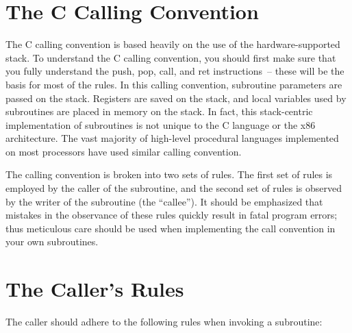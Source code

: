 \section{The C Calling Convention}

The C calling convention is based heavily on the use of the
hardware-supported stack. To understand the C calling convention, you
should first make sure that you fully understand the push, pop, call,
and ret instructions~-- these will be the basis for most of the rules.
In this calling convention, subroutine parameters are passed on the
stack. Registers are saved on the stack, and local variables used by
subroutines are placed in memory on the stack. In fact, this
stack-centric implementation of subroutines is not unique to the C
language or the x86 architecture. The vast majority of high-level
procedural languages implemented on most processors have used similar
calling convention.

The calling convention is broken into two sets of rules. The first set
of rules is employed by the caller of the subroutine, and the second
set of rules is observed by the writer of the subroutine (the
``callee''). It should be emphasized that mistakes in the observance
of these rules quickly result in fatal program errors; thus meticulous
care should be used when implementing the call convention in your own
subroutines.

\section{The Caller's Rules}

The caller should adhere to the following rules when invoking a
subroutine:

